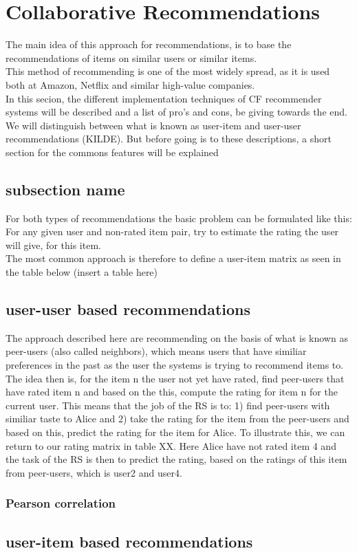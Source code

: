 \section{Collaborative Recommendations}
The main idea of this approach for recommendations, is to base the recommendations of items on similar users or similar items.\\
This method of recommending is one of the most widely spread, as it is used both at Amazon, Netflix and similar high-value companies.\\
In this secion, the different implementation techniques of CF recommender systems will be described and a list of pro's and cons, be giving towards the end. We will distinguish between what is known as user-item and user-user recommendations (KILDE). But before going is to these descriptions, a short section for the commons features will be explained\\

\subsection{subsection name} %
\label{sub:subsection_name}
For both types of recommendations the basic problem can be formulated like this: For any given user and non-rated item pair, try to estimate the rating the user will give, for this item.\\
The most common approach is therefore to define a user-item matrix as seen in the table below (insert a table here)

\subsection{user-user based recommendations} %
\label{sub:user_user_based_recommendations}
The approach described here are recommending on the basis of what is known as peer-users (also called neighbors), which means users that have similiar preferences in the past as the user the systems is trying to recommend items to. The idea then is, for the item n the user not yet have rated, find peer-users that have rated item n and based on the this, compute the rating for item n for the current user. This means that the job of the RS is to: 1) find peer-users with similiar taste to Alice and 2) take the rating for the item from the peer-users and based on this, predict the rating for the item for Alice.
To illustrate this, we can return to our rating matrix in table XX. Here Alice have not rated item 4 and the task of the RS is then to predict the rating, based on the ratings of this item from peer-users, which is user2 and user4. 

\subsubsection{Pearson correlation}


\subsection{user-item based recommendations} %
\label{sub:user_item_based_recommendations}


